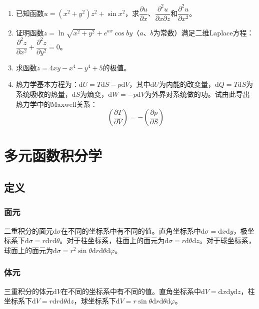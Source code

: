 \documentclass[fontset=none,openany,a4paper]{ctexbook}
\begin{document}
\begin{enumerate}

    \item 已知函数$u=(x^2+y^2)z^2+\sin x^2$，求$\dfrac{\partial u}{\partial x}$、$\dfrac{\partial^2 u}{\partial x\partial z}$和$\dfrac{\partial^2 u}{\partial x^2}$。

    \item 证明函数$z=\ln\sqrt{x^2+y^2}+e^{ax}\cos by$（$a$、$b$为常数）满足二维Laplace方程：$\dfrac{\partial^2 z}{\partial x^2}+\dfrac{\partial^2 z}{\partial y^2}=0$。

    \item 求函数$z=4xy-x^4-y^4+5$的极值。

    \item 热力学基本方程为：$\mathrm{d}U=T\mathrm{d}S-p\mathrm{d}V$，其中$\mathrm{d}U$为内能的改变量，$\mathrm{d}Q=T\mathrm{d}S$为系统吸收的热量，$\mathrm{d}S$为熵变，$\mathrm{d}W=-p\mathrm{d}V$为外界对系统做的功。试由此导出热力学中的Maxwell关系：
    \[
    \left(\frac{\partial T}{\partial V}\right) = -\left(\frac{\partial p}{\partial S}\right)
    \]

\end{enumerate}

\chapter{多元函数积分学}

\section{定义}

\subsection{面元}

二重积分的面元$\mathrm{d}\sigma$在不同的坐标系中有不同的值。直角坐标系中$\mathrm{d}\sigma=\mathrm{d}x\mathrm{d}y$，极坐标系下$\mathrm{d}\sigma=r\mathrm{d}r\mathrm{d}\theta$。对于柱坐标系，柱面上的面元为$\mathrm{d}\sigma=r\mathrm{d}\theta\mathrm{d}z$。对于球坐标系，球面上的面元为$\mathrm{d}\sigma=r^2\sin\theta\mathrm{d}r\mathrm{d}\theta\mathrm{d}\varphi$。

\subsection{体元}

三重积分的体元$\mathrm{d}V$在不同的坐标系中有不同的值。直角坐标系中$\mathrm{d}V=\mathrm{d}x\mathrm{d}y\mathrm{d}z$，柱坐标系下$\mathrm{d}V=r\mathrm{d}r\mathrm{d}\theta\mathrm{d}z$，球坐标系下$\mathrm{d}V=r\sin\theta\mathrm{d}r\mathrm{d}\theta\mathrm{d}\varphi$。
\end{document}
